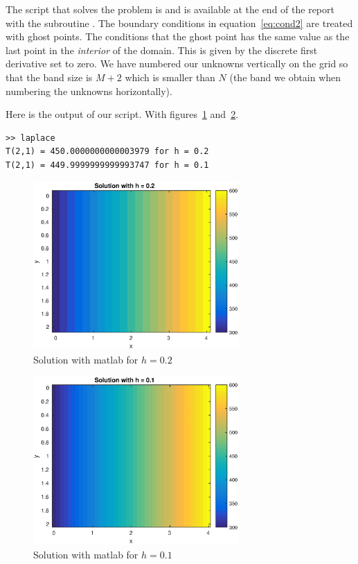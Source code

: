 
The script that solves the problem is  and is available at the end of the report with the subroutine . The boundary conditions in equation~\eqref{eq:cond2} are treated with ghost points. The conditions that the ghost point has the same value as the last point in the \textit{interior} of the domain. This is given by the discrete first derivative set to zero. We have numbered our unknowns vertically on the grid so that the band size is $M+2$ which is smaller than $N$ (the band we obtain when numbering the unknowns horizontally).

Here is the output of our script. With figures~\ref{fig:h02} and~\ref{fig:h01}.

\begin{lstlisting}
>> laplace
T(2,1) = 450.0000000000003979 for h = 0.2 
T(2,1) = 449.9999999999993747 for h = 0.1 
\end{lstlisting}

\begin{figure}[!h]
\centering
\includegraphics[width = 0.7\textwidth]{./h02.eps}
\caption{Solution with matlab for $h = 0.2$}
\label{fig:h02}
\end{figure}

\begin{figure}[!h]
\centering
\includegraphics[width = 0.7\textwidth]{./h01.eps}
\caption{Solution with matlab for $h = 0.1$}
\label{fig:h01}
\end{figure}

